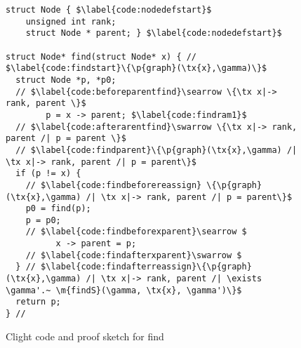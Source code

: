 \begin{figure}[t]
\vspace{-1ex}
  \begin{lstlisting}
struct Node { $\label{code:nodedefstart}$
    unsigned int rank;
    struct Node * parent; } $\label{code:nodedefstart}$

struct Node* find(struct Node* x) { // $\label{code:findstart}\{\p{graph}(\tx{x},\gamma)\}$
  struct Node *p, *p0;
  // $\label{code:beforeparentfind}\searrow \{\tx x|-> rank, parent \}$
        p = x -> parent; $\label{code:findram1}$
  // $\label{code:afterarentfind}\swarrow \{\tx x|-> rank, parent /| p = parent \}$
  // $\label{code:findparent}\{\p{graph}(\tx{x},\gamma) /| \tx x|-> rank, parent /| p = parent\}$
  if (p != x) {
    // $\label{code:findbeforereassign} \{\p{graph}(\tx{x},\gamma) /| \tx x|-> rank, parent /| p = parent\}$
    p0 = find(p); 
    p = p0; 
    // $\label{code:findbeforexparent}\searrow $
          x -> parent = p;
    // $\label{code:findafterxparent}\swarrow $
  } // $\label{code:findafterreassign}\{\p{graph}(\tx{x},\gamma) /| \tx x|-> rank, parent /| \exists \gamma'.~ \m{findS}(\gamma, \tx{x}, \gamma')\}$   
  return p;
} //
\end{lstlisting}








\vspace{-0.4em}
\caption{Clight code and proof sketch for find}
\label{fig:find}
\vspace{-1em}
\end{figure}